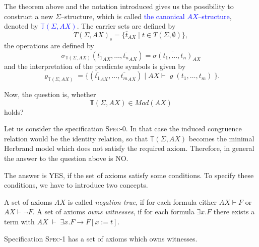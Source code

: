 \documentclass[landscape, autoslides, light]{mmiss}
\newcommand{\ns}{\normalsize}
\begin{document}
\begin{Package}[Label={FSDPT}, Title={Formal Specification of Data and Process Types}, ShortTitle={FSDPT}, Authors={Horst Reichel}, Date={February 2003}, LevelOfDetail=Lecture, Language=en-GB]
\begin{Section}[Title={Initial Algebras as Data Types}, Label={section3}]
\begin{Section}[Title={Existence of initial models}, Label={section3_1}]
\begin{Paragraph}[Label=Paragraph33]
\end{Paragraph}
\begin{Paragraph}[Title={Canonical Structure}, Label=Paragraph34]
 The theorem above and the notation introduced gives us
the possibility to construct a new $\Sigma$--structure, which is
called \textcolor{blue}{the canonical $AX$--structure}, denoted by
\textcolor{blue}{$\mathbb{T}(\Sigma,AX)$}. The carrier sets are
defined by
$$T(\Sigma,AX)_s = \{ \overline{t}_{AX} \; | \; t \in T(\Sigma,
\emptyset) \},$$ the operations are defined by $$
\sigma_{\mathbb{T}(\Sigma,AX)}( \overline{t_1}_{AX}, \ldots ,
\overline{t_n}_{AX}) = \overline{ \sigma (t_1, \ldots ,
t_n)}_{AX}$$
 and the interpretation of the predicate symbols is given by
$$ \varrho_{\mathbb{T}(\Sigma,AX)} =  \{ (\overline{t_1}_{AX},
\ldots , \overline{t_m}_{AX} ) \; | \; AX \vdash \varrho (t_1,
\ldots , t_m) \; \}.$$


\end{Paragraph}
\begin{Paragraph}[Label=Paragraph35]
\ns
 Now, the question is, whether $$ \mathbb{T}(\Sigma,AX) \in
Mod(AX)$$ holds?

Let us consider the specification \textsc{Spec-0}. In that case
the induced congruence relation would be the identity relation, so
that $ \mathbb{T}(\Sigma,AX)$ becomes the minimal Herbrand model
which does not satisfy the required axiom. Therefore, in general
the answer to the question above is NO.


\end{Paragraph}
\begin{Paragraph}[Label=Paragraph36]

\small
The answer is YES, if the set of axioms satisfy some  conditions.
To specify these conditions, we have to introduce two concepts.
\begin{List}[ListType=enumeration]
  \ListItem A set of axioms $AX$ is called \emph{negation true}, if for
  each formula either $AX \vdash F$ or $AX \vdash \neg F$.
  \ListItem A set of axioms \emph{owns witnesses}, if for each formula
  $\exists x . F$ there exists a term with
  $AX \; \vdash \; \exists x . F \rightarrow F[x := t]$.
\end{List}
Specification \textsc{Spec-1} has a set of axioms  which owns
witnesses.




\end{Paragraph}
\end{Section}
\end{Section}
\end{Package}
\end{document}
